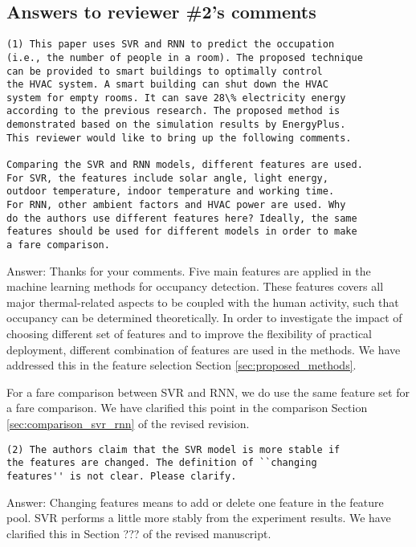 \subsection{Answers to reviewer \#2's comments}
\begin{verbatim}
(1) This paper uses SVR and RNN to predict the occupation
(i.e., the number of people in a room). The proposed technique
can be provided to smart buildings to optimally control
the HVAC system. A smart building can shut down the HVAC
system for empty rooms. It can save 28\% electricity energy
according to the previous research. The proposed method is
demonstrated based on the simulation results by EnergyPlus.
This reviewer would like to bring up the following comments.

Comparing the SVR and RNN models, different features are used.
For SVR, the features include solar angle, light energy,
outdoor temperature, indoor temperature and working time.
For RNN, other ambient factors and HVAC power are used. Why
do the authors use different features here? Ideally, the same
features should be used for different models in order to make
a fare comparison.
\end{verbatim}

Answer:
Thanks for your comments. Five main features are applied in the machine learning methods for occupancy detection.
These features covers all major thermal-related aspects to be coupled with the human activity, such that
occupancy can be determined theoretically. In order to investigate the impact
of choosing different set of features and to improve the flexibility of practical
deployment, different combination of features are used in the methods. We have addressed this in the feature selection Section
\ref{sec:proposed_methods}.

For a fare comparison between SVR and RNN, we do use the same feature
set for a fare comparison. We have clarified this point in the comparison Section \ref{sec:comparison_svr_rnn} of the revised
revision.

\begin{verbatim}
(2) The authors claim that the SVR model is more stable if
the features are changed. The definition of ``changing
features'' is not clear. Please clarify.
\end{verbatim}

Answer: Changing features means to add or delete one feature in the feature pool. SVR
performs a little more stably from the experiment results. We have clarified
this in Section ??? of the revised manuscript.

